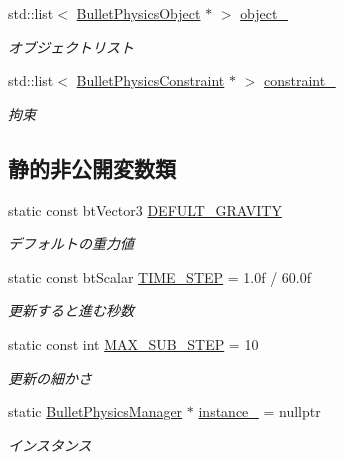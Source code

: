 \begin{DoxyCompactItemize}
std\+::list$<$ \mbox{\hyperlink{class_bullet_physics_object}{Bullet\+Physics\+Object}} $\ast$ $>$ \mbox{\hyperlink{class_bullet_physics_manager_aeb28861b2291675a67cd710611b33244}{object\+\_\+}}
\begin{DoxyCompactList}\small\item\em オブジェクトリスト \end{DoxyCompactList}\item 
std\+::list$<$ \mbox{\hyperlink{class_bullet_physics_constraint}{Bullet\+Physics\+Constraint}} $\ast$ $>$ \mbox{\hyperlink{class_bullet_physics_manager_a216431f03ee96997473e19b6dbbef01c}{constraint\+\_\+}}
\begin{DoxyCompactList}\small\item\em 拘束 \end{DoxyCompactList}\end{DoxyCompactItemize}
\subsection*{静的非公開変数類}
\begin{DoxyCompactItemize}
\item 
static const bt\+Vector3 \mbox{\hyperlink{class_bullet_physics_manager_a50d93547f618b581928fb0328f30e1f4}{D\+E\+F\+U\+L\+T\+\_\+\+G\+R\+A\+V\+I\+TY}}
\begin{DoxyCompactList}\small\item\em デフォルトの重力値 \end{DoxyCompactList}\item 
static const bt\+Scalar \mbox{\hyperlink{class_bullet_physics_manager_a77df988ab75c091f8d56b8ffb41e9012}{T\+I\+M\+E\+\_\+\+S\+T\+EP}} = 1.\+0f / 60.\+0f
\begin{DoxyCompactList}\small\item\em 更新すると進む秒数 \end{DoxyCompactList}\item 
static const int \mbox{\hyperlink{class_bullet_physics_manager_aaccc2256165c4d9f2aa9630ac6ca20f6}{M\+A\+X\+\_\+\+S\+U\+B\+\_\+\+S\+T\+EP}} = 10
\begin{DoxyCompactList}\small\item\em 更新の細かさ \end{DoxyCompactList}\item 
static \mbox{\hyperlink{class_bullet_physics_manager}{Bullet\+Physics\+Manager}} $\ast$ \mbox{\hyperlink{class_bullet_physics_manager_ad26c2767666f071dc1b39fba7138cd20}{instance\+\_\+}} = nullptr
\begin{DoxyCompactList}\small\item\em インスタンス \end{DoxyCompactList}\end{DoxyCompactItemize}


